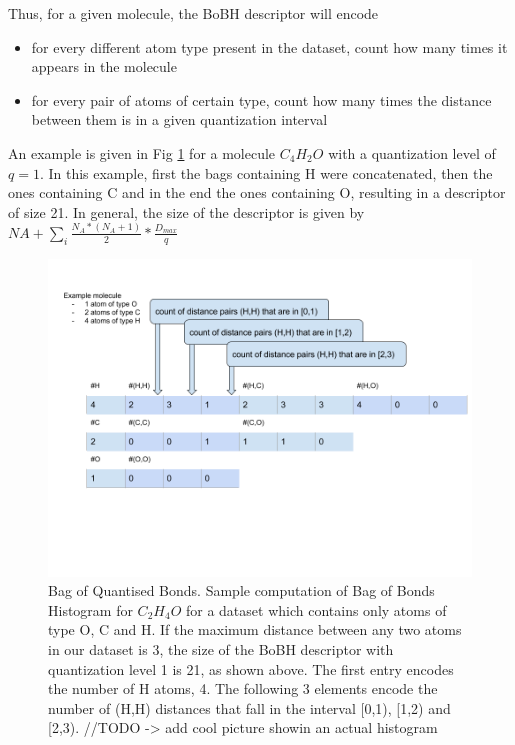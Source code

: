 \documentclass{article}
\begin{document}
Thus, for a given molecule, the BoBH descriptor will encode
\begin{itemize}
\item 
for every different atom type present in the dataset, count how many times it appears in the molecule
\item  
for every pair of atoms of certain type, count how many times the distance between them is in a given quantization interval 
\end{itemize}

An example is given in Fig \ref{fig:BoBH} for a molecule $C_{4}H_{2}O$ with a quantization level of $q=1$. In this example, first the bags containing H were concatenated, then the ones containing C and in the end the ones containing O, resulting in a descriptor of size 21. In general, the size of the descriptor is given by $NA + \sum_i \frac{N_A*(N_A+1)}{2} *\frac{D_{max}}{q} $ 

\begin{figure}[h!]

\includegraphics[scale=0.4]{HistogramOfDistances.png}
\caption{Bag of Quantised Bonds.
Sample computation of Bag of Bonds Histogram for $C_2H_4O$ for a dataset which contains only atoms of type O, C and H. If the maximum distance between any two atoms in our dataset is 3, the size of the BoBH descriptor with quantization level  1 is 21, as shown above. The first entry encodes the number of H atoms, 4. The following 3 elements encode the number of (H,H) distances that fall in the interval [0,1), [1,2) and [2,3).
//TODO -> add cool picture showin an actual histogram
}
\label{fig:BoBH}
\end{figure}
\end{document}
